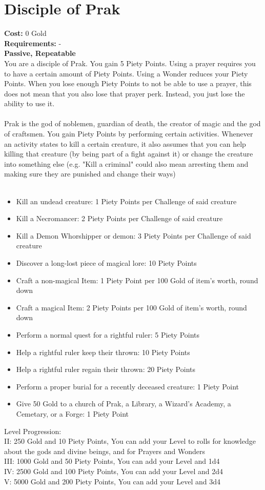 \section{Disciple of Prak}
\textbf{Cost:} 0 Gold\\
\textbf{Requirements:} - \\
\textbf{Passive, Repeatable}\\
You are a disciple of Prak. You gain 5 Piety Points. Using a prayer requires you to have a certain amount of Piety Points. Using a Wonder reduces your Piety Points. When you lose enough Piety Points to not be able to use a prayer, this does not mean that you also lose that prayer perk. Instead, you just lose the ability to use it.\\
\\
Prak is the god of noblemen, guardian of death, the creator of magic and the god of craftsmen. You gain Piety Points by performing certain activities. Whenever an activity states to kill a certain creature, it also assumes that you can help killing that creature (by being part of a fight against it) or change the creature into something else (e.g. "Kill a criminal" could also mean arresting them and making sure they are punished and change their ways)\\
\\
\begin{itemize}
	\item Kill an undead creature: 1 Piety Points per Challenge of said creature
	\item Kill a Necromancer: 2 Piety Points per Challenge of said creature
	\item Kill a Demon Whorshipper or demon: 3 Piety Points per Challenge of said creature
	\item Discover a long-lost piece of magical lore: 10 Piety Points
	\item Craft a non-magical Item: 1 Piety Point per 100 Gold of item's worth, round down
	\item Craft a magical Item: 2 Piety Points per 100 Gold of item's worth, round down
	\item Perform a normal quest for a rightful ruler: 5 Piety Points
	\item Help a rightful ruler keep their thrown: 10 Piety Points
	\item Help a rightful ruler regain their thrown: 20 Piety Points
	\item Perform a proper burial for a recently deceased creature: 1 Piety Point
	\item Give 50 Gold to a church of Prak, a Library, a Wizard's Academy, a Cemetary, or a Forge: 1 Piety Point
\end{itemize}

Level Progression:\\
II: 250 Gold and 10 Piety Points, You can add your Level to rolls for knowledge about the gods and divine beings, and for Prayers and Wonders\\
III: 1000 Gold and 50 Piety Points, You can add your Level and 1d4\\
IV: 2500 Gold and 100 Piety Points, You can add your Level and 2d4\\
V: 5000 Gold and 200 Piety Points, You can add your Level and 3d4\\